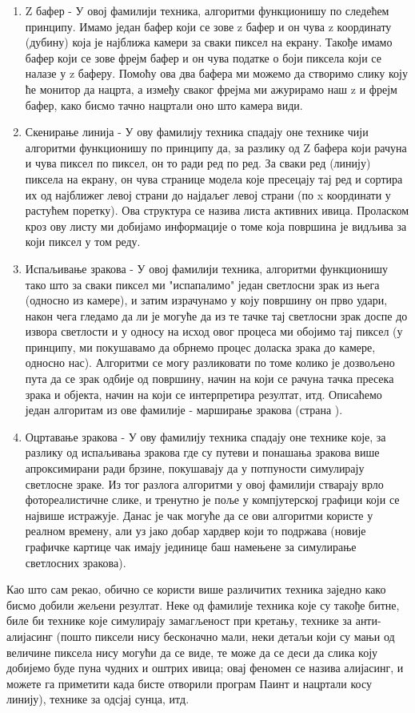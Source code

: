 \documentclass[12pt]{article}
\begin{document}
	\begin{enumerate}
	\item Z бафер - У овој фамилији техника, алгоритми функционишу по следећем принципу. Имамо један бафер који се зове z бафер и он чува z координату (дубину) која је најближа камери за сваки пиксел на екрану. Такође имамо бафер који се зове фрејм бафер и он чува податке о боји пиксела који се налазе у z баферу. Помоћу ова два бафера ми можемо да створимо слику коју ће монитор да нацрта, а између сваког фрејма ми ажурирамо наш z и фрејм бафер, како бисмо тачно нацртали оно што камера види.
	\item Скенирање линија - У ову фамилију техника спадају оне технике чији алгоритми функционишу по принципу да, за разлику од Z бафера који рачуна и чува пиксел по пиксел, он то ради ред по ред. За сваки ред (линију) пиксела на екрану, он чува странице модела које пресецају тај ред и сортира их од најближег левој страни до најдаљег левој страни (по x координати у растућем поретку). Ова структура се назива листа активних ивица. Проласком кроз ову листу ми добијамо информације о томе која површина је видљива за који пиксел у том реду.
	\item Испаљивање зракова - У овој фамилији техника, алгоритми функционишу тако што за сваки пиксел ми "испапалимо" један светлосни зрак из њега (односно из камере), и затим израчунамо у коју површину он прво удари, након чега гледамо да ли је могуће да из те тачке тај светлосни зрак доспе до извора светлости и у односу на исход овог процеса ми обојимо тај пиксел (у принципу, ми покушавамо да обрнемо процес доласка зрака до камере, односно нас). Алгоритми се могу разликовати по томе колико је дозвољено пута да се зрак одбије од површину, начин на који се рачуна тачка пресека зрака и објекта, начин на који се интерпретира резултат, итд. Описаћемо један алгоритам из ове фамилије - марширање зракова (страна \pageref{sfericnorenderovanje}).
	\item Оцртавање зракова - У ову фамилију техника спадају оне технике које, за разлику од испаљивања зракова где су путеви и понашања зракова више апроксимирани ради брзине, покушавају да у потпуности симулирају светлосне зраке. Из тог разлога алгоритми у овој фамилији стварају врло фотореалистичне слике, и тренутно је поље у компјутерској графици који се највише истражује. Данас је чак могуће да се ови алгоритми користе у реалном времену, али уз јако добар хардвер који то подржава (новије графичке картице чак имају јединице баш намењене за симулирање светлосних зракова).
	\end{enumerate}
	Као што сам рекао, обично се користи више различитих техника заједно како бисмо добили жељени резултат. Неке од фамилије техника које су такође битне, биле би технике које симулирају замагљеност при кретању, технике за анти-алијасинг (пошто пиксели нису бесконачно мали, неки детаљи који су мањи од величине пиксела нису могући да се виде, те може да се деси да слика коју добијемо буде пуна чудних и оштрих ивица; овај феномен се назива алијасинг, и можете га приметити када бисте отворили програм Паинт и нацртали косу линију), технике за одсјај сунца, итд.
	
\end{document}
